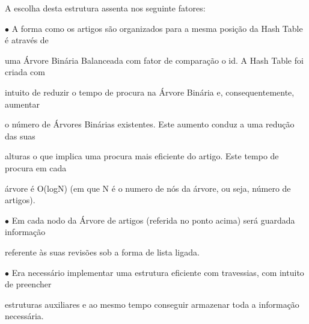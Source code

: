 \documentclass[a4paper,portrait,12pt]{article}
\begin{document}
\begin{flushleft}
A escolha desta estrutura assenta nos seguinte fatores:
\end{flushleft}





\begin{flushleft}
$\bullet$ A forma como os artigos são organizados para a mesma posição da Hash Table é através de
\end{flushleft}


\begin{flushleft}
uma Árvore Binária Balanceada com fator de comparação o id. A Hash Table foi criada com
\end{flushleft}


\begin{flushleft}
intuito de reduzir o tempo de procura na Árvore Binária e, consequentemente, aumentar
\end{flushleft}


\begin{flushleft}
o número de Árvores Binárias existentes. Este aumento conduz a uma redução das suas
\end{flushleft}


\begin{flushleft}
alturas o que implica uma procura mais eficiente do artigo. Este tempo de procura em cada
\end{flushleft}


\begin{flushleft}
árvore é O(logN) (em que N é o numero de nós da árvore, ou seja, número de artigos).
\end{flushleft}


\begin{flushleft}
$\bullet$ Em cada nodo da Árvore de artigos (referida no ponto acima) será guardada informação
\end{flushleft}


\begin{flushleft}
referente às suas revisões sob a forma de lista ligada.
\end{flushleft}


\begin{flushleft}
$\bullet$ Era necessário implementar uma estrutura eficiente com travessias, com intuito de preencher
\end{flushleft}


\begin{flushleft}
estruturas auxiliares e ao mesmo tempo conseguir armazenar toda a informação necessária.
\end{flushleft}
\end{document}

